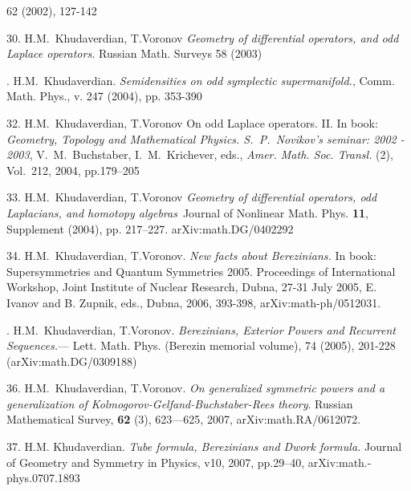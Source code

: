 \documentclass[12pt]{article}
\begin{document}
  62
(2002), 127-142 %

\medskip


30.  H.M.~Khudaverdian, T.Voronov {\it Geometry of
differential operators, and odd Laplace operators.} { Russian Math.
Surveys} 58 (2003) %


. H.M.~Khudaverdian.
      {\it Semidensities on odd symplectic supermanifold.},
   { Comm. Math. Phys.}, v. 247 (2004), pp. 353-390


\medskip

32.  H.M.~Khudaverdian, T.Voronov
On odd Laplace operators. II.
In book: \textit{Geometry, Topology and Mathematical Physics.
S.~P.~Novikov's seminar: 2002 - 2003}, V.~M.~Buchstaber,
I.~M.~Krichever, eds., \textit{Amer. Math. Soc. Transl.} (2),
Vol.~212, 2004, pp.179--205 %



\medskip


33.  H.M.~Khudaverdian, T.Voronov {\it Geometry of
differential operators, odd Laplacians, and homotopy algebras\,} { Journal of Nonlinear
Math. Phys.} {\bf 11}, Supplement  (2004), pp. 217--227.  arXiv:math.DG/0402292

\medskip

34. H.M.~Khudaverdian, T.Voronov. {\it New facts about Berezinians.}
In book: Supersymmetries and Quantum Symmetries 2005. Proceedings of
International Workshop, Joint Institute of Nuclear Research, Dubna,
27-31 July 2005, E. Ivanov and B. Zupnik, eds., Dubna, 2006,
393-398, arXiv:math-ph/0512031.


. H.M.~Khudaverdian, T.Voronov.
  {\it Berezinians, Exterior Powers and Recurrent
     Sequences.}--- {Lett. Math. Phys.} (Berezin memorial volume), 74
(2005), 201-228 (arXiv:math.DG/0309188)



\medskip

36. H.M.~Khudaverdian, T.Voronov. {\it On generalized symmetric powers
and a generalization of Kolmogorov-Gelfand-Buchstaber-Rees theory}. 
Russian Mathematical Survey, {\bf 62} (3), 623---625,  2007,
arXiv:math.RA/0612072.

37. H.M. Khudaverdian.  {\it Tube formula, Berezinians and Dwork formula.}
   Journal of Geometry and Symmetry in Physics, v10, 2007, pp.29--40,
  arXiv:math.-phys.0707.1893


\medskip
\end{document}
